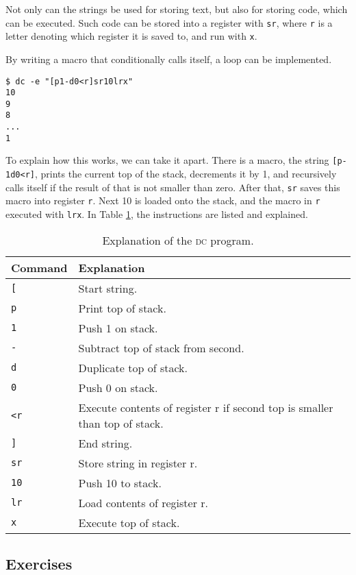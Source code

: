 \documentclass[a4paper,twocolumn]{article}
\begin{document}
Not only can the strings be used for storing text, but also for storing code, which can be executed. Such code can be stored into a register with \verb|sr|, where \verb|r| is a letter denoting which register it is saved to, and run with \verb|x|.

By writing a macro that conditionally calls itself, a loop can be implemented.

\begin{verbatim}
$ dc -e "[p1-d0<r]sr10lrx"
10
9
8
...
1
\end{verbatim}

To explain how this works, we can take it apart. There is a macro, the string \verb|[p-1d0<r]|, prints the current top of the stack, decrements it by 1, and recursively calls itself if the result of that is not smaller than zero. After that, \verb|sr| saves this macro into register \verb|r|. Next 10 is loaded onto the stack, and the macro in \verb|r| executed with \verb|lrx|. In Table \ref{tlb:dcloop}, the instructions are listed and explained.

\begin{table}[!h]
\centering
\caption{Explanation of the \textsc{dc} program.}\label{tlb:dcloop}
\begin{tabular}{@{}lp{5.7cm}@{}}
\toprule
Command & Explanation \\
\midrule
\verb|[| & Start string.\\
\verb|p| & Print top of stack.\\
\verb|1| & Push 1 on stack.\\
\verb|-| & Subtract top of stack from second.\\
\verb|d| & Duplicate top of stack.\\
\verb|0| & Push 0 on stack.\\
\verb|<r| & Execute contents of register r if second top is smaller than top of stack.\\
\verb|]| & End string.\\
\verb|sr| & Store string in register r.\\
\verb|10| & Push 10 to stack.\\
\verb|lr| & Load contents of register r.\\
\verb|x| & Execute top of stack.\\
\bottomrule
\end{tabular}
\end{table}

\subsection*{Exercises}
\end{document}
